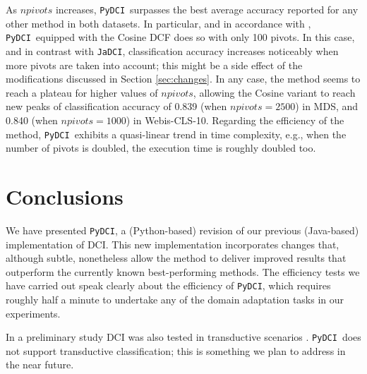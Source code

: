 \documentclass{article}
\newcommand{\jadci}{\texttt{JaDCI}}
\newcommand{\pydci}{\texttt{PyDCI}}
\begin{document}
As $npivots$ increases, \pydci\ surpasses the best average accuracy
reported for any other method in both datasets. In particular, and in
accordance with \citep{Moreo:2016fg}, \pydci\ equipped with the Cosine
DCF does so with only 100 pivots.  In this case, and in contrast with
\jadci, classification accuracy increases noticeably when more pivots
are taken into account; this might be a side effect of the
modifications discussed in Section \ref{sec:changes}.  In any case,
the method seems to reach a plateau for higher values of $npivots$,
allowing the Cosine variant to reach new peaks of classification
accuracy of 0.839 (when $npivots=2500$) in MDS, and 0.840 (when
$npivots=1000$) in Webis-CLS-10.  Regarding the efficiency of the
method, \pydci\ exhibits a quasi-linear trend in time complexity,
e.g., when the number of pivots is doubled, the execution time is
roughly doubled too.



\section{Conclusions}
\label{sec:conclusion}

\noindent We have presented \pydci, a (Python-based) revision of our
previous (Java-based) implementation of DCI.  This new implementation
incorporates changes that, although subtle, nonetheless allow the
method to deliver improved results that outperform the currently known
best-performing methods.  The efficiency tests we have carried out
speak clearly about the efficiency of \pydci, which requires roughly
half a minute to undertake any of the domain adaptation tasks in our
experiments.

In a preliminary study DCI was also tested in transductive scenarios
\citep{Moreo:2016pa}.  \pydci\ does not support transductive
classification; this is something we plan to address in the near
future.





\end{document}
